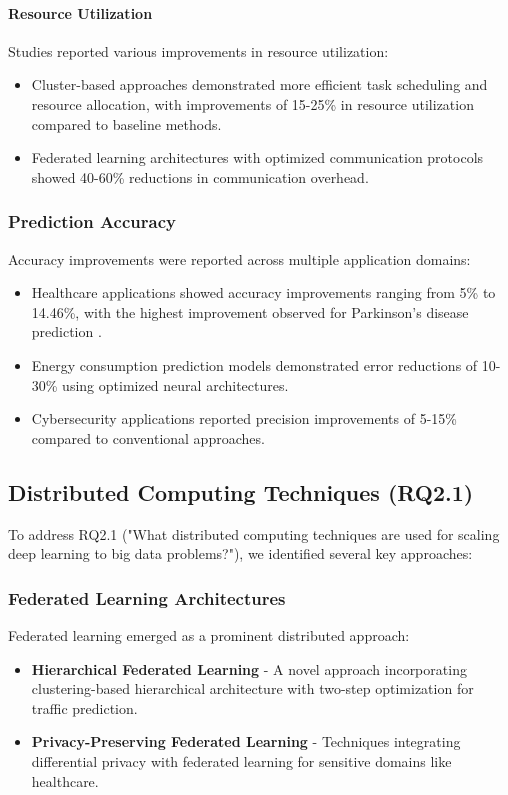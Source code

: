 \paragraph{Resource Utilization}
Studies reported various improvements in resource utilization:
\begin{itemize}
    \item Cluster-based approaches demonstrated more efficient task scheduling and resource allocation, with improvements of 15-25\% in resource utilization compared to baseline methods.
    
    \item Federated learning architectures with optimized communication protocols showed 40-60\% reductions in communication overhead.
\end{itemize}

\subsubsection{Prediction Accuracy}
Accuracy improvements were reported across multiple application domains:
\begin{itemize}
    \item Healthcare applications showed accuracy improvements ranging from 5\% to 14.46\%, with the highest improvement observed for Parkinson's disease prediction \citep{Ampavathi20211146}.
    
    \item Energy consumption prediction models demonstrated error reductions of 10-30\% using optimized neural architectures.
    
    \item Cybersecurity applications reported precision improvements of 5-15\% compared to conventional approaches.
\end{itemize}

\subsection{Distributed Computing Techniques (RQ2.1)}
To address RQ2.1 ("What distributed computing techniques are used for scaling deep learning to big data problems?"), we identified several key approaches:

\subsubsection{Federated Learning Architectures}
Federated learning emerged as a prominent distributed approach:
\begin{itemize}
    \item \textbf{Hierarchical Federated Learning} - A novel approach incorporating clustering-based hierarchical architecture with two-step optimization for traffic prediction.
    
    \item \textbf{Privacy-Preserving Federated Learning} - Techniques integrating differential privacy with federated learning for sensitive domains like healthcare.
\end{itemize}

